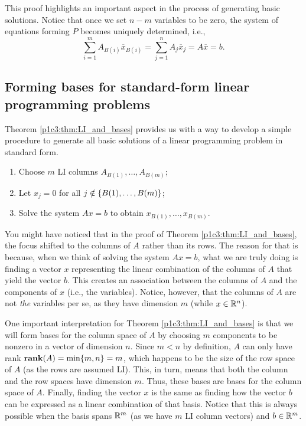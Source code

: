This proof highlights an important aspect in the process of generating basic solutions. Notice that once we set $n-m$ variables to be zero, the system of equations forming $P$ becomes uniquely determined, i.e., 
%
\begin{equation*}
	\sum_{i=1}^m A_{B(i)}\overline{x}_{B(i)} = \sum_{j=1}^n A_j\overline{x}_j = A\overline{x} = b.
\end{equation*}	
%


\subsection{Forming bases for standard-form linear programming problems}

Theorem \ref{p1c3:thm:LI_and_bases} provides us with a way to develop a simple procedure to generate all basic solutions of a linear programming problem in standard form.

\begin{enumerate}
	\item Choose $m$ LI columns $A_{B(1)}, \dots, A_{B(m)}$;
	\item Let $x_j = 0$ for all $j \notin \left\{ B(1), \dots, B(m) \right \}$;
	\item Solve the system $Ax = b$ to obtain $x_{B(1)}, \dots, x_{B(m)}$.
\end{enumerate}

You might have noticed that in the proof of Theorem \ref{p1c3:thm:LI_and_bases}, the focus shifted to the columns of $A$ rather than its rows. The reason for that is because, when we think of solving the system $Ax = b$, what we are truly doing is finding a vector $x$ representing the linear combination of the columns of $A$ that yield the vector $b$. This creates an association between the columns of $A$ and the components of $x$ (i.e., the variables). Notice, however, that the columns of $A$ are not \emph{the} variables per se, as they have dimension $m$ (while $x \in \mathbb{R}^n$). 

One important interpretation for Theorem \ref{p1c3:thm:LI_and_bases} is that we will form bases for the column space of $A$ by choosing $m$ components to be nonzero in a vector of dimension $n$. Since $m < n$ by definition, $A$ can only have rank $\mathop{\bf rank}(A) = \min\{m,n\} = m$, which happens to be the size of the row space of $A$ (as the rows are assumed LI). This, in turn, means that both the column and the row spaces have dimension $m$. Thus, these bases are bases for the column space of $A$. Finally, finding the vector $x$ is the same as finding how the vector $b$ can be expressed as a linear combination of that basis. Notice that this is always possible when the basis spans $\mathbb{R}^m$ (as we have $m$ LI column vectors) and $b \in \mathbb{R}^m$.

